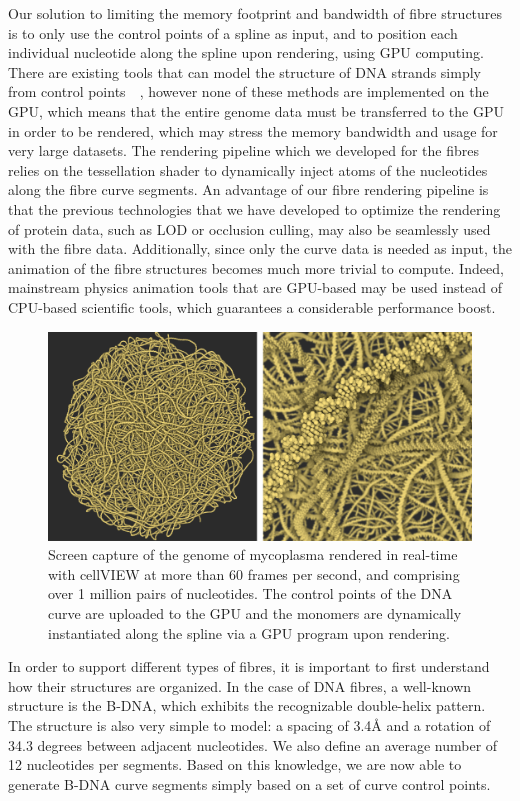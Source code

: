 Our solution to limiting the memory footprint and bandwidth of fibre structures is to only use the control points of a spline as input, and to position each individual nucleotide along the spline upon rendering, using GPU computing.
There are existing tools that can model the structure of DNA strands simply from control points~\cite{lu20083dna}~\cite{hornus2013easy}, however none of these methods are implemented on the GPU, which means that the entire genome data must be transferred to the GPU in order to be rendered, which may stress the memory bandwidth and usage for very large datasets.
The rendering pipeline which we developed for the fibres relies on the tessellation shader to dynamically inject atoms of the nucleotides along the fibre curve segments.
An advantage of our fibre rendering pipeline is that the previous technologies that we have developed to optimize the rendering of protein data, such as LOD or occlusion culling, may also be seamlessly used with the fibre data.
Additionally, since only the curve data is needed as input, the animation of the fibre structures becomes much more trivial to compute.
Indeed, mainstream physics animation tools that are GPU-based may be used instead of CPU-based scientific tools, which guarantees a considerable performance boost.
\begin{figure}
	\centering
	\includegraphics[width=0.90\linewidth]{graphics/Picture11}
	\caption{Screen capture of the genome of mycoplasma rendered in real-time with cellVIEW at more than 60 frames per second, and comprising over 1 million pairs of nucleotides.
		The control points of the DNA curve are uploaded to the GPU and the monomers are dynamically instantiated along the spline via a GPU program upon rendering. }
	\label{fig:picture11}
\end{figure}
In order to support different types of fibres, it is important to first understand how their structures are organized.
In the case of DNA fibres, a well-known structure is the B-DNA, which exhibits the recognizable double-helix pattern.
The structure is also very simple to model: a spacing of 3.4Å and a rotation of 34.3 degrees between adjacent nucleotides. 
We also define an average number of 12 nucleotides per segments.
Based on this knowledge, we are now able to generate B-DNA curve segments simply based on a set of curve control points.

